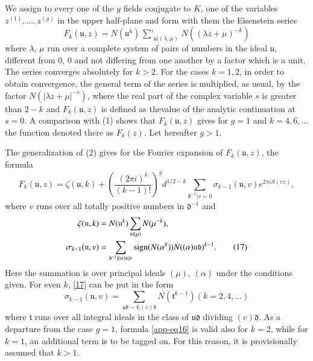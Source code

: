 We assign to every one of the $g$ fields conjugate to $K$, one of the
variables $z^{(1)},\ldots,z^{(g)}$ in the upper half-plane and form
with them the Eisenstein series
$$
F_{k}(\mathfrak{u},z)=N(\mathfrak{u}^{k})\mathop{{\sum}'}_{\mathfrak{u}|(\lambda,\mu)}N((\lambda
z+\mu)^{-k})
$$
where $\lambda$, $\mu$ run over a complete system of pairs of numbers
in the ideal $\mathfrak{u}$, different from $0$, $0$ and not differing
from one another by a factor which is a unit. The series converges
absolutely for $k>2$. For the cases $k=1,2$, in order to obtain
convergence, the general term of the series is multiplied, as usual,
by the factor $N(|\lambda z+\mu|^{-s})$, where the real part of the
complex variable $s$ is greater than $2-k$ and $F_{k}(\mathfrak{u},z)$
is defined as the\pageoriginale value of the analytic continuation at
$s=0$. A comparison with (1) shows that $F_{k}(\mathfrak{u},z)$ gives
for $g=1$ and $k=4,6,\ldots$ the function denoted there as
$F_{k}(z)$. Let hereafter $g>1$.

The generalization of (2) gives for the Fourier expansion of
$F_{k}(\mathfrak{u},z)$, the formula
\begin{equation*}
F_{k}(\mathfrak{u},z)=\zeta(\mathfrak{u},k)+\left(\frac{(2\pi
  i)^{k}}{(k-1)!}\right)^{g}d^{1/2-k}\sum_{\mathfrak{d}^{-1}|v \succ 0}\sigma_{k-1}(\mathfrak{u},v)e^{2\pi
  iS(vz)},\tag{16}\label{app-eq16} 
\end{equation*}
where $v$ runs over all totally positive numbers in $\mathfrak{d}^{-1}$ and
\begin{align*}
\zeta(\mathfrak{u},k) &=
N(\mathfrak{u}^{k})\sum_{\mathfrak{u}|(\mu)}N(\mu^{-k}),\\
\sigma_{k-1}(\mathfrak{u},v) &=
\sum_{\mathfrak{d}^{-1}|(\alpha)\mathfrak{u}|v}\operatorname{sign}
(N(\alpha^{k}))N((\alpha)\mathfrak{u}\mathfrak{d})^{k-1}. 
\tag{17}\label{app-eq17}
\end{align*}
Here the summation is over principal ideals $(\mu)$, $(\alpha)$ under
the conditions given. For even $k$, \eqref{17} can be put in the form
\begin{equation*}
\sigma_{k-1}(\mathfrak{u},v)=\sum_{\mathfrak{u}\mathfrak{d}\sim \mathfrak{t}|(v)\mathfrak{d}}N(\mathfrak{t}^{k-1})(k=2,4,\ldots)\tag{18}\label{app-eq18}
\end{equation*}
where $\mathfrak{t}$ runs over all integral ideals in the class of
$\mathfrak{u}\mathfrak{d}$ dividing $(v)\mathfrak{d}$. As a departure from the
case $g=1$, formula \eqref{app-eq16} is valid also for $k=2$, while
for $k=1$, an additional term is to be tagged on. For this reason, it
is provisionally assumed that $k>1$.

